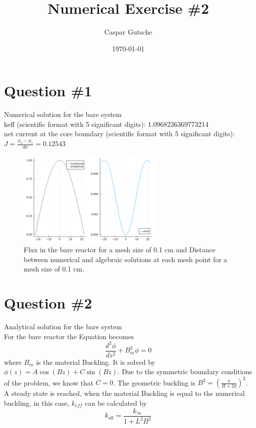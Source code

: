 \documentclass[11pt,a4paper]{article}
\begin{document}
\title{Numerical Exercise \#2}
\author{Caspar Gutsche\\  %
}
\date{\today}
\maketitle



\newpage
\section{Question \#1}
Numerical solution for the bare system \\
keff (scientific format with 5 significant digits): 1.0968236369773214 \\
net current at the core boundary (scientific format with 5 significant digits): $J = \frac{\phi_{2}-\phi_{1}}{dx}= 0.12543$ \\
\begin{figure}[h]
	\includegraphics[width=7cm]{../figs/ex2/bare.png}
	\centering
	\caption{Flux in the bare reactor for a mesh size of 0.1 cm and Distance between numerical and algebraic solutions at each mesh point for a mesh size of 0.1 cm.}
\end{figure}

\section{Question \#2}
Analytical solution for the bare system\\
For the bare reactor the Equation becomes
$$
\frac{d^2 \phi}{d z^2}+B_m^2 \phi=0
$$
where $B_{m}$ is the material Buckling. 
It is solved by $\phi(z)=A \cos (B z)+C \sin (B z)$. Due to the symmetric boundary conditions of the problem, we know that $C=0$. The geometric buckling is $B^2=\left(\frac{\pi}{H+2 d}\right)^2$.
A steady state is reached, when the material Buckling is equal to the numerical buckling, in this case, $k_{eff}$ can be calculated by
$$
k_{\mathrm{eff}}=\frac{k_{\infty}}{1+L^2 B^2}
$$
\end{document}
